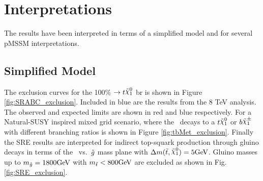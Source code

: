 
\section{Interpretations}

The results have been interpreted in terms of a simplified model and for several pMSSM interpretations.

\subsection{Simplified Model}
The exclusion curves for the 100\% \stop $\ra t\ninoone$ \gls{br} is shown in Figure \ref{fig:SRABC_exclusion}.  Included in blue are the results from the 8 TeV analysis.  The observed and expected limits are shown in red and blue respectively.  For a Natural-SUSY inspired mixed grid scenario, where the \stop\ decays to a $t\ninoone$ or $b\chinoonepm$ with different branching ratios is shown in Figure \ref{fig:tbMet_exclusion}.  Finally the SRE results are interpreted for indirect top-squark production through gluino decays in terms of the \stop\ vs.\ $\tilde{g}$ mass plane with $\Delta m(\stop,\ninoone)=5\GeV$. Gluino masses up to $m_{\gluino}=1800\GeV$ with $\mstop<800\GeV$ are excluded as shown in Fig. \ref{fig:SRE_exclusion}. 

